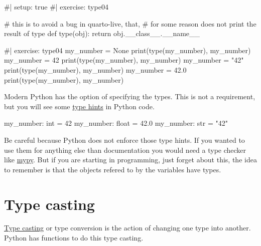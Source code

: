 \documentclass[
  letterpaper,
  DIV=11,
  numbers=noendperiod]{scrreprt}
\newenvironment{Shaded}{\begin{snugshade}}{\end{snugshade}}
\newcommand{\NormalTok}[1]{\textcolor[rgb]{0.00,0.23,0.31}{#1}}
\theoremstyle{remark}
\begin{document}
\begin{Shaded}
\begin{Highlighting}[]
\NormalTok{\#| setup: true}
\NormalTok{\#| exercise: type04}

\NormalTok{\# this is to avoid a bug in quarto{-}live, that,}
\NormalTok{\# for some reason does not print the result of type}
\NormalTok{def type(obj):}
\NormalTok{    return obj.\_\_class\_\_.\_\_name\_\_}
\end{Highlighting}
\end{Shaded}

\begin{Shaded}
\begin{Highlighting}[]
\NormalTok{\#| exercise: type04}
\NormalTok{my\_number = None}
\NormalTok{print(type(my\_number), my\_number)}
\NormalTok{my\_number = 42}
\NormalTok{print(type(my\_number), my\_number)}
\NormalTok{my\_number = "42"}
\NormalTok{print(type(my\_number), my\_number)}
\NormalTok{my\_number = 42.0}
\NormalTok{print(type(my\_number), my\_number)}
\end{Highlighting}
\end{Shaded}

Modern Python has the option of specifying the types. This is not a
requirement, but you will see some
\href{https://docs.python.org/3/library/typing.html}{type hints} in
Python code.

\begin{Shaded}
\begin{Highlighting}[]
\NormalTok{my\_number: int = 42}
\NormalTok{my\_number: float = 42.0}
\NormalTok{my\_number: str = "42"}
\end{Highlighting}
\end{Shaded}

Be careful because Python does not enforce those type hints. If you
wanted to use them for anything else than documentation you would need a
type checker like \href{https://mypy-lang.org/}{mypy}. But if you are
starting in programming, just forget about this, the idea to remember is
that the objects refered to by the variables have types.

\section{Type casting}\label{type-casting}

\href{https://en.wikipedia.org/wiki/Type_conversion}{Type casting} or
type conversion is the action of changing one type into another. Python
has functions to do this type casting.
\end{document}
